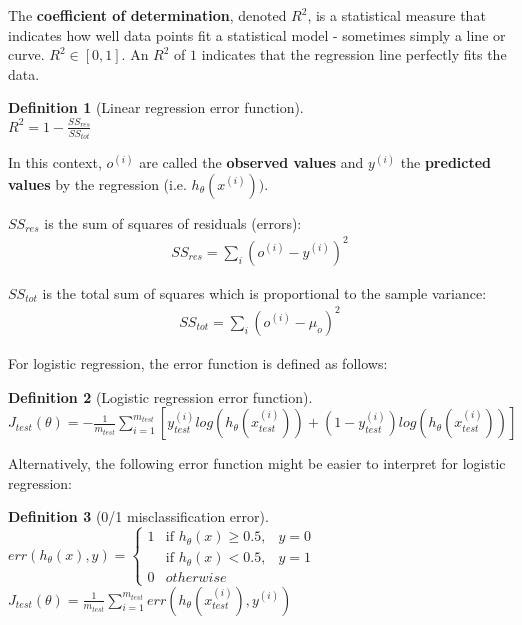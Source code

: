 \documentclass{report}
\newtheorem{definition}{Definition}[section]
\begin{document}
The {\bf coefficient of determination}, denoted {\bf $R^2$}, is a statistical measure that indicates how well data points fit a statistical model - sometimes simply a line or curve.
$R^2 \in [0,1]$. An $R^2$ of $1$ indicates that the regression line perfectly fits the data.

\begin{definition}[Linear regression error function] ~\\
$R^2 = 1 - \frac{SS_{res}}{SS_{tot}}$
\end{definition}

In this context, $o^{(i)}$ are called the {\bf observed values} and $y^{(i)}$ the {\bf predicted values} by the regression (i.e. $h_{\theta}(x^{(i)}))$.

$SS_{res}$ is the sum of squares of residuals (errors):
\begin{align*}
SS_{res} = \sum_i(o^{(i)} - y^{(i)})^2
\end{align*}

$SS_{tot}$ is the total sum of squares which is proportional to the sample variance:
\begin{align*}
SS_{tot} = \sum_i(o^{(i)} - \mu_o)^2
\end{align*}


For logistic regression, the error function is defined as follows:

\begin{definition}[Logistic regression error function] ~\\
$J_{test}(\theta) = -\frac{1}{m_{test}}\sum_{i=1}^{m_{test}}[y_{test}^{(i)}log(h_\theta(x_{test}^{(i)}))+(1-y_{test}^{(i)})log(h_\theta(x_{test}^{(i)}))]$
\end{definition}

Alternatively, the following error function might be easier to interpret for logistic regression:

\begin{definition}[0/1 misclassification error] ~\\
$err(h_\theta(x),y)=
\left\{
\begin{array}{lll}
1  & \mbox{if } h_\theta(x) \geq 0.5, & y=0 \\
  & \mbox{if } h_\theta(x) < 0.5, & y=1 \\
0 & otherwise
\end{array}
\right.$ \\
$J_{test}(\theta) = \frac{1}{m_{test}}\sum_{i=1}^{m_{test}}err(h_\theta(x_{test}^{(i)}),y^{(i)})$
\end{definition}
\end{document}
